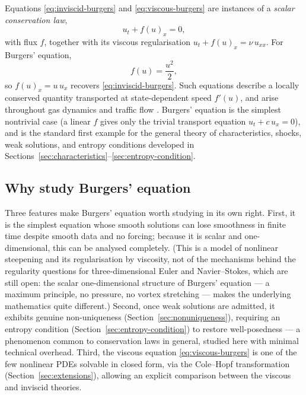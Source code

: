 Equations \eqref{eq:inviscid-burgers} and \eqref{eq:viscous-burgers} are
instances of a \emph{scalar conservation law},
\begin{equation}
  \label{eq:general-conservation-law}
  u_t + f(u)_x = 0,
\end{equation}
with flux $f$, together with its viscous regularisation $u_t + f(u)_x =
\nu\, u_{xx}$. For Burgers' equation,
\begin{equation}
  \label{eq:burgers-flux}
  f(u) = \frac{u^2}{2},
\end{equation}
so $f(u)_x = u\,u_x$ recovers \eqref{eq:inviscid-burgers}. Such equations
describe a locally conserved quantity transported at state-dependent
speed $f'(u)$, and arise throughout gas dynamics and traffic flow
\cite{lighthill1955}. Burgers' equation is the simplest nontrivial case (a
linear $f$ gives only the trivial transport equation $u_t + c\,u_x=0$),
and is the standard first example for the general theory of
characteristics, shocks, weak solutions, and entropy conditions developed
in Sections~\ref{sec:characteristics}--\ref{sec:entropy-condition}.

\subsection{Why study Burgers' equation}
\label{subsec:significance}

Three features make Burgers' equation worth studying in its own right.
First, it is the simplest equation whose smooth solutions can lose
smoothness in finite time despite smooth data and no forcing; because it
is scalar and one-dimensional, this can be analysed completely. (This is a model of nonlinear
steepening and its regularisation by viscosity, not of the mechanisms behind
the regularity questions for three-dimensional Euler and Navier--Stokes,
which are still open: the scalar one-dimensional structure of Burgers'
equation --- a maximum principle, no pressure, no vortex stretching --- makes
the underlying mathematics quite different.) Second, once weak solutions are admitted, it exhibits
genuine non-uniqueness (Section~\ref{sec:nonuniqueness}), requiring an
entropy condition (Section~\ref{sec:entropy-condition}) to restore
well-posedness --- a phenomenon common to conservation laws in general,
studied here with minimal technical overhead. Third, the viscous equation
\eqref{eq:viscous-burgers} is one of the few nonlinear PDEs solvable in
closed form, via the Cole--Hopf transformation
(Section~\ref{sec:extensions}), allowing an explicit comparison between
the viscous and inviscid theories.

